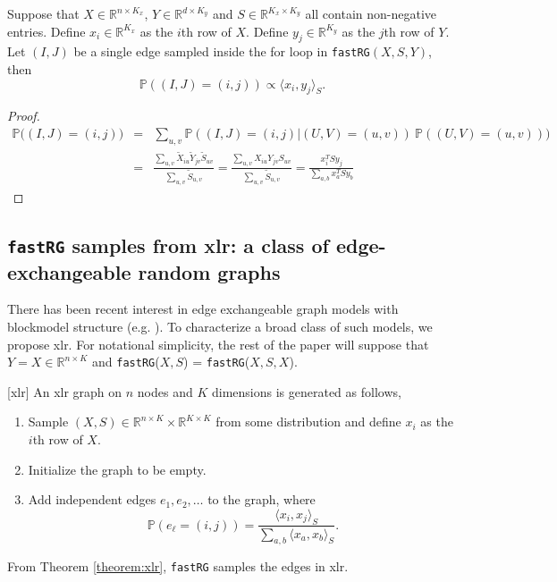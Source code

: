 \documentclass[twoside,11pt]{article}
\begin{document}
\begin{theorem}\label{theorem:xlr}
Suppose that $X \in \mathds{R}^{n \times K_x}$, $Y \in \mathds{R}^{d \times K_y}$ and $S \in \mathds{R}^{K_x \times K_y}$  all contain non-negative entries. Define $x_i \in \mathds{R}^{K_x}$ as the $i$th row of $X$. Define $y_j \in \mathds{R}^{K_y}$ as the $j$th row of $Y$.  Let $(I,J)$ be a single edge sampled inside the for loop in \texttt{fastRG}$(X,S,Y)$, then
\[\mathbb{P}\left((I,J) = (i,j)\right) \propto \langle x_i,y_j \rangle _S.\]
\end{theorem}
\begin{proof}
\begin{eqnarray*} 
\mathbb{P}\big((I,J)=(i,j)\big) &=& \sum_{u,v} \mathbb{P}((I,J)=(i,j)|(U,V)=(u,v)) \ \mathbb{P}((U,V)=(u,v))) \\
&=& \frac{\sum_{u,v} \tilde X_{iu} \tilde Y_{jv}\tilde S_{uv}}{\sum_{u,v} \tilde S_{u,v}} = \frac{ \sum_{u,v} X_{iu} Y_{jv} S_{uv}}{\sum_{u,v} \tilde S_{u,v}} = \frac{x_i^TS y_j}{\sum_{a,b}  x_a^TS y_b}
\end{eqnarray*}
\end{proof}

\noindent
 
 
 
 
\subsection{\texttt{fastRG} samples from xlr: a class of edge-exchangeable random graphs}\label{sec:xlr}

There has been recent interest in edge exchangeable graph models with blockmodel structure (e.g. \citealt{crane2016edge, cai2016edge, NIPS2016_6521, 2016arXiv160202114T}). To characterize a broad class of such models, we propose xlr.   For notational simplicity, the rest of the paper will suppose that $Y = X \in \mathds{R}^{n \times K}$ and \texttt{fastRG}($X,S$) = \texttt{fastRG}($X,S,X$). 


\begin{definition}\label{def:xlr}[xlr] An xlr graph on $n$ nodes and $K$ dimensions is generated as follows,
\begin{enumerate}
\item Sample $(X,S) \in   \mathds{R}^{n \times K} \times \mathds{R}^{K \times K}$ from some distribution and define $x_i$ as the $i$th row of $X$.
\item Initialize the graph to be empty.
\item Add independent edges $e_1, e_2, \dots$ to the graph, where 
\[\mathbb{P}(e_\ell = (i,j)) = \frac{\langle x_i,x_j \rangle _S }{ \sum_{a,b} \langle x_a,x_b \rangle _S}.\]
\end{enumerate}
\end{definition}
From Theorem \ref{theorem:xlr}, \texttt{fastRG} samples the edges in xlr. 
\end{document}
